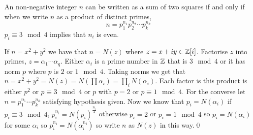 \documentclass{article}
\begin{document}
\begin{itemize}
\begin{corollary}
  An non-negative integer $ n $ can be written as a sum of two squares if and only if when we write $ n $ as a product of distinct primes,
  \[
	  n=p_1^{n_1}p_2^{n_2}\cdots p_k^{n_k}
  \]
  $ p_i\equiv 3\mod 4 $ implies that $ n_i $ is even.
\end{corollary}
\pf If $ n=x^2+y^2 $ we have that $ n=N(z) $ where $ z=x+iy\in \mathbb{Z}[i] $. Factorise $ z $ into primes, $ z=\alpha_1\cdots\alpha_q $. Either $ \alpha_i $ is a prime number in $ \mathbb{Z} $ that is $ 3\mod 4 $ or it has norm $ p $ where $ p $ is $ 2 $ or $ 1\mod 4 $. Taking norms we get that $ n=x^2+y^2=N(z)=N(\prod \alpha_i)=\prod_i N(\alpha_i) $. Each factor is this product is either $ p^2 $ or $ p\equiv 3\mod 4 $ or $ p $ with $ p=2 $ or $ p\equiv 1\mod 4 $. For the converse let $ n=p_1^{n_1}\cdots p_k^{n_k} $ satisfying hypothesis given. Now we know that $ p_i=N(\alpha_i) $ if $ p_i\equiv 3\mod 4 $, $ p_i^{n_i}=N(p_i)^{\frac{n_i}2} $ otherwise $ p_i=2 $ or $ p_i=1\mod 4 $ so $ p_i=N(\alpha_i) $ for some $ \alpha_i $ so $ p_i^{n_i}=N(\alpha_i^{n_i}) $ so write $ n $ as $ N(z) $ in this way.\qed


\end{itemize}
\end{document}
